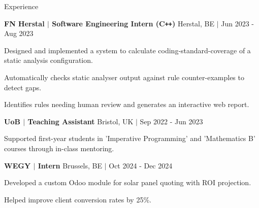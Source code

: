 \documentclass{resume} %
\let\olditemize\itemize
\let\endolditemize\enditemize
\renewenvironment{itemize}{
  \vspace*{-6pt}
  \olditemize
  \setlength{\itemsep}{0pt}    %
  \setlength{\topsep}{0pt}         %
  \setlength{\partopsep}{0pt}      %
  \setlength{\parsep}{0pt}         %
  \setlength{\parskip}{0pt}        %
  \setlength{\leftmargin}{1em}     %
}{\endolditemize}
\begin{document}
\begin{rSection}{Experience}

\textbf{FN Herstal $\boldsymbol{\vert}$ Software Engineering Intern (C\texttt{++})} \hfill Herstal, BE $\boldsymbol{\vert}$ Jun 2023 - Aug 2023
\begin{itemize}
    \item Designed and implemented a system to calculate coding-standard-coverage of a static analysis configuration.
    \item Automatically checks static analyser output against rule counter-examples to detect gaps.
    \item Identifies rules needing human review and generates an interactive web report.
\end{itemize}

\textbf{UoB $\boldsymbol{\vert}$ Teaching Assistant} \hfill Bristol, UK $\boldsymbol{\vert}$ Sep 2022 - Jun 2023
\begin{itemize}
    \item Supported first-year students in 'Imperative Programming' and 'Mathematics B' courses through in-class mentoring.
\end{itemize}

\textbf{WEGY $\boldsymbol{\vert}$ Intern} \hfill Brussels, BE $\boldsymbol{\vert}$ Oct 2024 - Dec 2024
\begin{itemize}
    \item Developed a custom Odoo module for solar panel quoting with ROI projection.
    \item Helped improve client conversion rates by 25\%.
\end{itemize}

\end{rSection}

\end{document}
